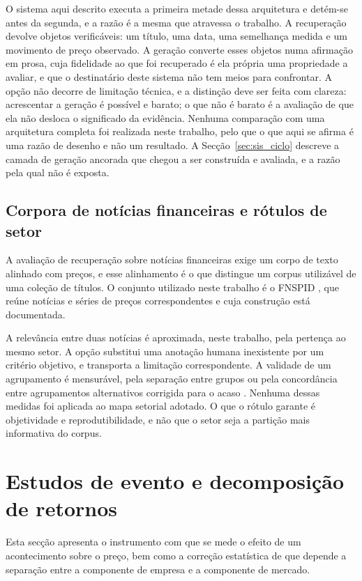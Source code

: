 O sistema aqui descrito executa a primeira metade dessa arquitetura e detém-se antes da segunda, e a
razão é a mesma que atravessa o trabalho. A recuperação devolve objetos verificáveis: um título, uma
data, uma semelhança medida e um movimento de preço observado. A geração converte esses objetos numa
afirmação em prosa, cuja fidelidade ao que foi recuperado é ela própria uma propriedade a avaliar, e
que o destinatário deste sistema não tem meios para confrontar. A opção não decorre de limitação
técnica, e a distinção deve ser feita com clareza: acrescentar a geração é possível e barato; o que
não é barato é a avaliação de que ela não desloca o significado da evidência. Nenhuma comparação com
uma arquitetura completa foi realizada neste trabalho, pelo que o que aqui se afirma é uma razão de
desenho e não um resultado. A Secção~\ref{sec:sis_ciclo} descreve a camada de geração ancorada que
chegou a ser construída e avaliada, e a razão pela qual não é exposta.

\subsection{Corpora de notícias financeiras e rótulos de setor}

A avaliação de recuperação sobre notícias financeiras exige um corpo de texto alinhado com preços, e
esse alinhamento é o que distingue um corpus utilizável de uma coleção de títulos. O conjunto
utilizado neste trabalho é o \gls{FNSPID} \autocite{dong2024fnspid}, que reúne notícias e séries de
preços correspondentes e cuja construção está documentada.

A relevância entre duas notícias é aproximada, neste trabalho, pela pertença ao mesmo setor. A opção substitui uma anotação humana inexistente por um critério objetivo, e transporta a
limitação correspondente. A validade de um agrupamento é mensurável, pela separação entre grupos
\autocite{rousseeuw1987silhouettes} ou pela concordância entre agrupamentos alternativos corrigida
para o acaso \autocite{vinh2010ami}. Nenhuma dessas medidas foi aplicada ao mapa setorial adotado. O que o rótulo garante é objetividade e reprodutibilidade, e não que o setor seja
a partição mais informativa do corpus.

\section{Estudos de evento e decomposição de retornos}
\label{sec:ctx_evento}

Esta secção apresenta o instrumento com que se mede o efeito de um acontecimento sobre o preço, bem
como a correção estatística de que depende a separação entre a componente de empresa e a componente
de mercado.

